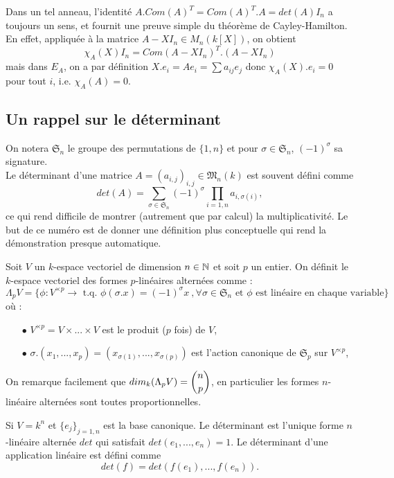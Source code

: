 Dans un tel anneau, l'identité $A.Com(A)^T = Com(A)^T . A = det(A)I_n$ a toujours un sens, et fournit une preuve simple du théorème de Cayley-Hamilton. En effet, appliquée à la matrice $A-XI_n\in M_n(k[X])$, on obtient 
\[\chi_A(X) I_n = Com(A-XI_n)^T . (A-XI_n)\]
mais dans $E_A$, on a par définition $X.e_i=Ae_i = \sum a_{ij}e_j$ donc $\chi_A(X).e_i=0$ pour tout $i$, i.e. $\chi_A(A)=0$.\\ 

\subsection{Un rappel sur le déterminant}
On notera $\mathfrak S_n $ le groupe des permutations de $\{1,n\}$ et pour $\sigma\in\mathfrak S_n$, $(-1)^\sigma$ sa signature.\\

Le déterminant d'une matrice $A=(a_{i,j})_{i,j}\in \mathfrak M_n(k)$ est souvent défini comme 
\[det(A) = \sum_{\sigma\in \mathfrak S_n} (-1)^\sigma \prod_{i=1,n} a_{i,\sigma(i)},\]
ce qui rend difficile de montrer (autrement que par calcul) la multiplicativité. Le but de ce numéro est de donner une définition plus conceptuelle qui rend la démonstration presque automatique.\\

\begin{definition}
Soit $V$ un $k$-espace vectoriel de dimension $n\in \mathbb N$ et soit $p$ un entier. On définit le $k$-espace vectoriel des formes $p$-linéaires alternées comme :
\[\Lambda_p V = \{ \phi : V^{\times p} \rightarrow \text{ t.q. } \phi(\sigma.x)= (-1)^\sigma x\ ,\forall \sigma\in \mathfrak S_n \text{ et } \phi \text{ est linéaire en chaque variable}\}\]
où :
\begin{itemize}
\item[$\bullet$] $V^{\times p} = V\times ... \times V$ est le produit ($p$ fois) de $V$,
\item[$\bullet$] $\sigma.(x_1,...,x_p) = (x_{\sigma(1)},...,x_{\sigma(p)}) $ est l'action canonique de $\mathfrak S_p$ sur $V^{\times p}$,
\end{itemize}
\end{definition}

On remarque facilement que $dim_k (\Lambda_p V )= \dbinom{n}{p}$, en particulier les formes $n$-linéaire alternées sont toutes proportionnelles.

\begin{definition} Si $V = k^n$ et $\{e_j\}_{j=1,n}$ est la base canonique.
Le déterminant est l'unique forme $n$-linéaire alternée $det$ qui satisfait $det(e_1,...,e_n)=1$. Le déterminant d'une application linéaire est défini comme 
\[det(f) = det(f(e_1),...,f(e_n)).\]
\end{definition}

